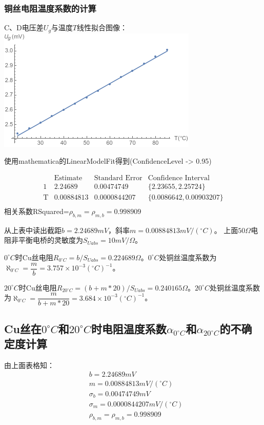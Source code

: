 \documentclass[UEF8]{ctexart}
\begin{document}
\begin{multicols}{2}
\subsubsection{铜丝电阻温度系数的计算}
C、D电压差$U_{g}$与温度$T$线性拟合图像：
\includegraphics[scale=0.55]{graphs/OriginaldataCU.png}

使用mathematica的LinearModelFit得到(ConfidenceLevel -> 0.95)

\small
$$\begin{array}{l|lll}
	\text{} & \text{Estimate} & \text{Standard Error} & \text{Confidence Interval} \\
	\hline
	1 & 2.24689 & 0.00474749 & \{2.23655,2.25724\} \\
	\text{T} & 0.00884813 & 0.0000844207 & \{0.0086642,0.00903207\} \\
\end{array}$$
相关系数RSquared=$\rho_{b,m}=\rho_{m,b}=0.998909$

\normalsize
从上表中读出截距$b=2.24689mV$，斜率$m=0.00884813mV/(^\circ{C})$。
上面$50\Omega$电阻非平衡电桥的灵敏度为$S_{Uabs}=10mV/\Omega$。

$0^\circ{C}$时Cu丝电阻$R_{0^\circ{C}}=b/S_{Uabs}=0.224689\Omega$。$0^\circ{C}$处铜丝温度系数为$\aleph_{0^\circ{C}}=\dfrac{m}{b}=3.757\times10^{-3}(^\circ{C})^{-1}$。

$20^\circ{C}$时Cu丝电阻$R_{20^\circ{C}}=(b+m*20)/S_{Uabs}=0.240165\Omega$。$20^\circ{C}$处铜丝温度系数为$\aleph_{0^\circ{C}}=\dfrac{m}{b+m*20}=3.684\times10^{-3}(^\circ{C})^{-1}$。

\subsection{Cu丝在$0^\circ{C}$和$20^\circ{C}$时电阻温度系数$\alpha_{0^\circ{C}}$和$\alpha_{20^\circ{C}}$的不确定度计算}
由上面表格知：
\begin{equation*}
\begin{aligned}
& b=2.24689mV\\
& m=0.00884813mV/(^\circ{C}) \\
& \sigma_{b}=0.00474749mV \\
& \sigma_{m}=0.0000844207mV/(^\circ{C}) \\
& \rho_{b,m}=\rho_{m,b}=0.998909
\end{aligned}
\end{equation*}


\end{multicols}
\end{document}
